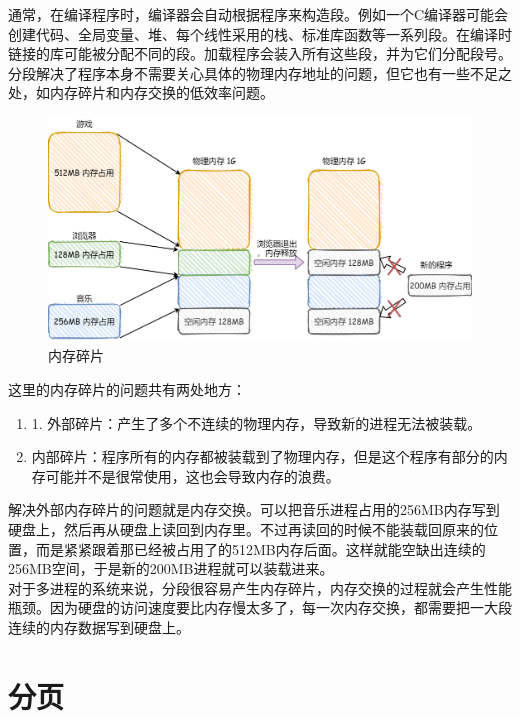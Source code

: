 通常，在编译程序时，编译器会自动根据程序来构造段。例如一个C编译器可能会创建代码、全局变量、堆、每个线性采用的栈、标准库函数等一系列段。在编译时链接的库可能被分配不同的段。加载程序会装入所有这些段，并为它们分配段号。 \\

分段解决了程序本身不需要关心具体的物理内存地址的问题，但它也有一些不足之处，如内存碎片和内存交换的低效率问题。

\begin{figure}[H]
	\centering
	\includegraphics[scale=0.25]{img/C3/3-4/2.png}
	\caption{内存碎片}
\end{figure}

这里的内存碎片的问题共有两处地方：

\begin{enumerate}
	\item 1. 外部碎片：产生了多个不连续的物理内存，导致新的进程无法被装载。

	\item 内部碎片：程序所有的内存都被装载到了物理内存，但是这个程序有部分的内存可能并不是很常使用，这也会导致内存的浪费。
\end{enumerate}

解决外部内存碎片的问题就是内存交换。可以把音乐进程占用的256MB内存写到硬盘上，然后再从硬盘上读回到内存里。不过再读回的时候不能装载回原来的位置，而是紧紧跟着那已经被占用了的512MB内存后面。这样就能空缺出连续的256MB空间，于是新的200MB进程就可以装载进来。 \\

对于多进程的系统来说，分段很容易产生内存碎片，内存交换的过程就会产生性能瓶颈。因为硬盘的访问速度要比内存慢太多了，每一次内存交换，都需要把一大段连续的内存数据写到硬盘上。

\newpage

\section{分页}

